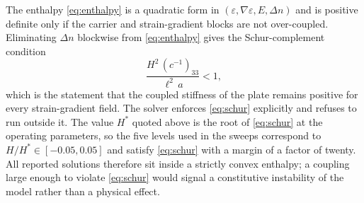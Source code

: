 The enthalpy \eqref{eq:enthalpy} is a quadratic form in
$(\varepsilon,\nabla\varepsilon,E,\Delta n)$ and is positive definite only if
the carrier and strain-gradient blocks are not over-coupled.  Eliminating
$\Delta n$ blockwise from \eqref{eq:enthalpy} gives the Schur-complement
condition
\begin{equation}
\label{eq:schur}
\frac{H^2\,(c^{-1})_{33}}{\ell^{2}\,a}<1 ,
\end{equation}
which is the statement that the coupled stiffness of the plate remains positive
for every strain-gradient field.  The solver enforces \eqref{eq:schur}
explicitly and refuses to run outside it.  The value $H^{*}$ quoted above is the
root of \eqref{eq:schur} at the operating parameters, so the five levels used in
the sweeps correspond to $H/H^{*}\in[-0.05,0.05]$ and satisfy
\eqref{eq:schur} with a margin of a factor of twenty.  All reported solutions
therefore sit inside a strictly convex enthalpy; a coupling large enough to
violate \eqref{eq:schur} would signal a constitutive instability of the model
rather than a physical effect.
